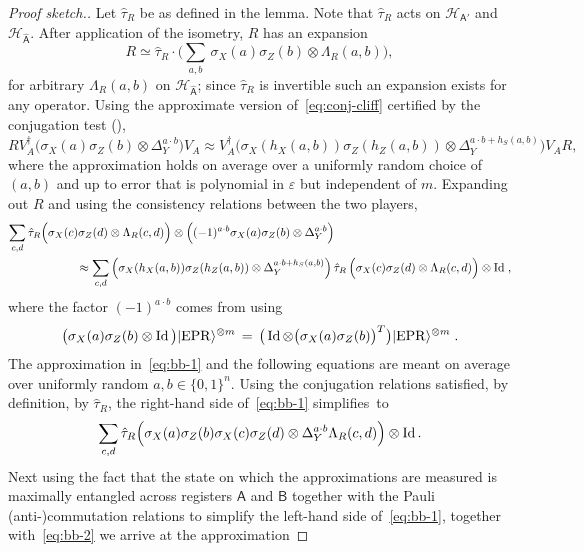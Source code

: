 \documentclass{toc}
\newcommand{\ket}[1]{|#1\rangle}
\newcommand{\Id}{\ensuremath{\mathop{\rm Id}\nolimits}}
\newcommand{\reg}[1]{{\textsf{#1}}}
\newcommand{\mH}{\mathcal{H}}
\newcommand{\eps}{\varepsilon}
\newcommand{\EPR}{{\rm EPR}}
\newcommand{\phase}{\Lambda}
\begin{document}
\begin{proof}[Proof sketch.]
Let $\hat{\tau}_R$ be as defined in the lemma. Note that $\hat{\tau}_R$ acts on $\mH_{\reg{A}'}$ and $\mH_{\hat{\reg{A}}}$. After application of the isometry, $R$ has an expansion
\begin{equation}\label{eq:r-1}
R \simeq \hat{\tau}_R \cdot \Big(\sum_{a,b} \,\sigma_X(a)\sigma_Z(b) \otimes \phase_R(a,b)\Big),
\end{equation}
 for arbitrary $\phase_R(a,b)$ on $\mH_{\hat{\reg{A}}}$; since $\hat{\tau}_R $ is invertible such an expansion exists for any operator. 
Using the approximate version of~\eqref{eq:conj-cliff} certified by the conjugation test (), 
$$ R V_A^\dagger \big(\sigma_X(a)\sigma_Z(b)\otimes \Delta_Y^{a\cdot b}\big) V_A \approx V_A^\dagger \big(\sigma_X(h_X(a,b))\sigma_Z(h_Z(a,b)) \otimes \Delta_Y^{a\cdot b + h_S(a,b)}\big)V_A R,$$
where the approximation holds on average over a uniformly random choice of $(a,b)$ and up to error that is polynomial in $\eps$ but independent of $m$. 
Expanding out $R$ and using the consistency relations between the two players, 
\begin{align}
\sum_{c,d} \hat{\tau}_R \Big(\sigma_X(c)\sigma_Z(d) &\otimes \phase_R(c,d)\Big) \otimes \Big((-1)^{a\cdot b}\sigma_X(a)\sigma_Z(b)\otimes \Delta_Y^{a\cdot b}\Big)\notag\\
& \!\!\!\!\!\!\!\!\!\!\!\!\!\!\!\!\approx \sum_{c,d} \Big(\sigma_X(h_X(a,b))\sigma_Z(h_Z(a,b)) \otimes \Delta_Y^{a\cdot b + h_S(a,b)}\Big) \,\hat{\tau}_R \, \Big(\sigma_X(c)\sigma_Z(d) \otimes \phase_R(c,d)\Big) \otimes \Id\;,\label{eq:bb-1}
\end{align}
where the factor $(-1)^{a\cdot b}$ comes from using 
$$\big(\sigma_X(a)\sigma_Z(b)\otimes \Id\big) \ket{\EPR}^{\otimes m} \,=\, \big(\Id \otimes \big(\sigma_X(a)\sigma_Z(b)\big)^T \big)\ket{\EPR}^{\otimes m}\;.$$
The approximation in~\eqref{eq:bb-1} and the following equations are meant on average over uniformly random $a,b\in\{0,1\}^n$.
Using the conjugation relations satisfied, by definition, by $\hat{\tau}_R$,  the right-hand side of~\eqref{eq:bb-1} simplifies~to 
\begin{equation}\label{eq:bb-2}
\sum_{c,d} \hat{\tau}_R \Big(\sigma_X(a)\sigma_Z(b) \sigma_X(c)\sigma_Z(d) \otimes \Delta_Y^{a\cdot b }\phase_R(c,d)\Big)  \otimes \Id.
\end{equation}
Next using the fact that the state on which the approximations are measured is maximally entangled across registers $\reg{A}$ and $\reg{B}$ together with the Pauli (anti-)commutation relations to simplify the left-hand side of~\eqref{eq:bb-1}, together with~\eqref{eq:bb-2} we arrive at the approximation

\end{proof}
\end{document}
